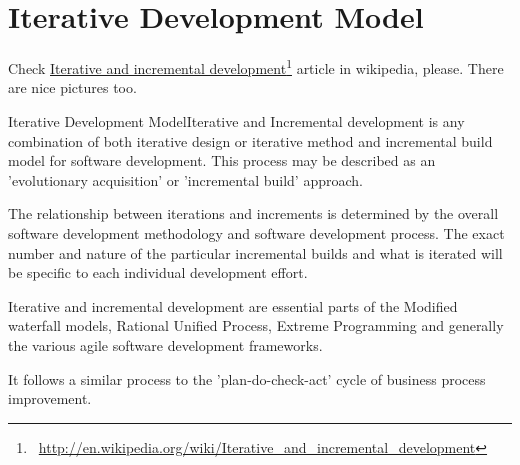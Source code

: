 \section{Iterative Development Model}
\label{sec:Iterative Development Model}

Check \href{http://en.wikipedia.org/wiki/Iterative_and_incremental_development}{Iterative and incremental development}\footnote{~\url{http://en.wikipedia.org/wiki/Iterative_and_incremental_development}} article in wikipedia, please. There are nice pictures too.

Iterative Development ModelIterative and Incremental development is any combination of both iterative design or iterative method and incremental build model for software development. This process may be described as an 'evolutionary acquisition' or 'incremental build' approach.

The relationship between iterations and increments is determined by the overall software development methodology and software development process. The exact number and nature of the particular incremental builds and what is iterated will be specific to each individual development effort.

Iterative and incremental development are essential parts of the Modified waterfall models, Rational Unified Process, Extreme Programming and generally the various agile software development frameworks.

It follows a similar process to the 'plan-do-check-act' cycle of business process improvement.
